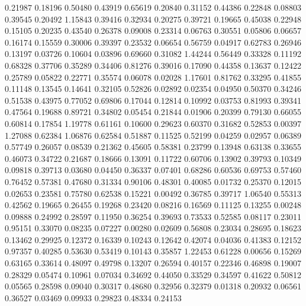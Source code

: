   0.21987 0.18196
  0.50480 0.43919
  0.65619 0.20840
  0.31152 0.44386
  0.22848 0.08803
  0.39545 0.20492
  1.15843 0.39416
  0.32934 0.20275
  0.39721 0.19665
  0.45038 0.22948
  0.15105 0.20235
  0.43540 0.26378
  0.09008 0.23314
  0.06763 0.30551
  0.05806 0.06657
  0.16174 0.15559
  0.30006 0.39397
  0.23532 0.06654
  0.56759 0.04917
  0.62783 0.26946
  0.13197 0.03726
  0.10604 0.03896
  0.69660 0.31082
  1.44244 0.56449
  0.33328 0.11192
  0.68328 0.37706
  0.35289 0.34406
  0.81276 0.39016
  0.17090 0.44358
  0.13637 0.12422
  0.25789 0.05822
  0.22771 0.35574
  0.06078 0.02028
  1.17601 0.81762
  0.33295 0.41855
  0.11148 0.13545
  0.14641 0.32105
  0.52826 0.02892
  0.02354 0.04950
  0.50370 0.34246
  0.51538 0.43975
  0.77052 0.69806
  0.17044 0.12814
  0.10992 0.03753
  0.81993 0.39341
  0.47564 0.19688
  0.89721 0.34802
  0.05454 0.21844
  0.01906 0.20399
  0.79130 0.66055
  0.60814 0.17854
  1.19778 0.61161
  0.10600 0.29623
  0.60370 0.31682
  0.52853 0.00397
  1.27088 0.62384
  1.06876 0.62584
  0.51887 0.11525
  0.52199 0.04259
  0.02957 0.06389
  0.57749 0.26057
  0.08539 0.21362
  0.45605 0.58381
  0.23799 0.13948
  0.63138 0.33655
  0.46073 0.34722
  0.21687 0.18666
  0.13091 0.11722
  0.60706 0.13902
  0.39793 0.10349
  0.09818 0.39713
  0.03680 0.04450
  0.36337 0.07401
  0.68286 0.60536
  0.69753 0.57460
  0.76452 0.57381
  0.47680 0.31334
  0.90106 0.48301
  0.40085 0.01732
  0.25370 0.12015
  0.02653 0.23581
  0.75780 0.62538
  0.15221 0.00492
  0.36785 0.39717
  1.06540 0.55313
  0.42562 0.19665
  0.26455 0.19268
  0.23420 0.08216
  0.16569 0.11125
  0.13255 0.00248
  0.09888 0.24992
  0.28597 0.11950
  0.36254 0.39693
  0.73533 0.52585
  0.08117 0.23011
  0.95151 0.33070
  0.08235 0.07227
  0.00280 0.02609
  0.56808 0.23034
  0.28695 0.18623
  0.13462 0.29925
  0.12372 0.16339
  0.10243 0.12642
  0.42074 0.04036
  0.41383 0.12152
  0.97357 0.40285
  0.53630 0.53419
  0.10143 0.35857
  1.22453 0.61228
  0.00656 0.15269
  0.63165 0.33614
  0.48097 0.49798
  0.13207 0.26594
  0.40157 0.22346
  0.46898 0.19007
  0.28329 0.05474
  0.10961 0.07034
  0.34692 0.44050
  0.33529 0.34597
  0.41622 0.50812
  0.05565 0.28598
  0.09040 0.30317
  0.48680 0.32956
  0.32379 0.01318
  0.20932 0.06561
  0.36527 0.03469
  0.09933 0.29823
  0.48334 0.24153
